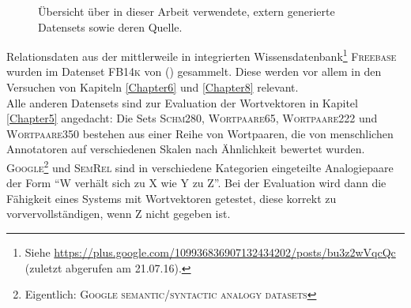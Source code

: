   \begin{figure}[h]
    \centering
    \def\arraystretch{1.5}
  \caption[Übersicht über verwendete vorgefertigte Datensets]{Übersicht über in dieser Arbeit verwendete, extern generierte
  Datensets sowie deren Quelle.\label{fig:datasets}}
  \end{figure}

  Relationsdaten aus der mittlerweile in  integrierten Wissensdatenbank\footnote{Siehe
  \url{https://plus.google.com/109936836907132434202/posts/bu3z2wVqcQc} (zuletzt abgerufen am 21.07.16).}
   \textsc{Freebase} wurden im Datenset \textsc{FB14k} von (\cite{bordes2013translating}) gesammelt.
  Diese werden vor allem in den Versuchen von Kapiteln \ref{Chapter6} und \ref{Chapter8} relevant.\\
  Alle anderen Datensets sind zur Evaluation der Wortvektoren in Kapitel \ref{Chapter5} angedacht: Die Sets
  \textsc{Schm280}, \textsc{Wortpaare65}, \textsc{Wortpaare222} und \textsc{Wortpaare350} bestehen aus einer Reihe
  von Wortpaaren, die von menschlichen Annotatoren auf verschiedenen Skalen nach Ähnlichkeit bewertet wurden.\\
  \textsc{Google}\footnote{Eigentlich: \textsc{Google semantic/syntactic analogy datasets}} und \textsc{SemRel} sind
  in verschiedene Kategorien eingeteilte Analogiepaare der Form ``W verhält sich zu X wie Y zu Z''. Bei der Evaluation
  wird dann die Fähigkeit eines Systems mit Wortvektoren getestet, diese korrekt zu vorvervollständigen, wenn Z nicht
  gegeben ist.


